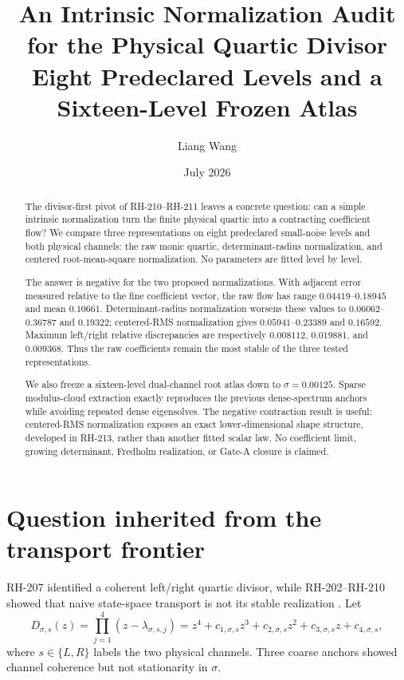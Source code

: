\documentclass[12pt]{article}
\title{An Intrinsic Normalization Audit for the Physical Quartic Divisor\\
\large Eight Predeclared Levels and a Sixteen-Level Frozen Atlas}
\author{Liang Wang}\date{July 2026}
\theoremstyle{remark}\newtheorem{remark}[theorem]{Remark}
\begin{document}
\maketitle
\begin{abstract}
The divisor-first pivot of RH-210--RH-211 leaves a concrete question: can a
simple intrinsic normalization turn the finite physical quartic into a
contracting coefficient flow?  We compare three representations on eight
predeclared small-noise levels and both physical channels: the raw monic
quartic, determinant-radius normalization, and centered root-mean-square
normalization.  No parameters are fitted level by level.

The answer is negative for the two proposed normalizations.  With adjacent
error measured relative to the fine coefficient vector, the raw flow has
range $0.04419$--$0.18945$ and mean $0.10661$.  Determinant-radius
normalization worsens these values to $0.06062$--$0.36787$ and $0.19322$;
centered-RMS normalization gives $0.05941$--$0.23389$ and $0.16592$.
Maximum left/right relative discrepancies are respectively $0.008112$,
$0.019881$, and $0.009368$.  Thus the raw coefficients remain the most
stable of the three tested representations.

We also freeze a sixteen-level dual-channel root atlas down to
$\sigma=0.00125$.  Sparse modulus-cloud extraction exactly reproduces the
previous dense-spectrum anchors while avoiding repeated dense eigensolves.
The negative contraction result is useful: centered-RMS normalization exposes
an exact lower-dimensional shape structure, developed in RH-213, rather than
another fitted scalar law.  No coefficient limit, growing determinant,
Fredholm realization, or Gate-A closure is claimed.
\end{abstract}

\section{Question inherited from the transport frontier}

RH-207 identified a coherent left/right quartic divisor, while RH-202--RH-210
showed that naive state-space transport is not its stable realization
\citep{WangRH207,WangRH210,WangRH211}.  Let
\begin{equation}\label{eq:raw}
 D_{\sigma,s}(z)=\prod_{j=1}^{4}(z-\lambda_{\sigma,s,j})
 =z^4+c_{1,\sigma,s}z^3+c_{2,\sigma,s}z^2
   +c_{3,\sigma,s}z+c_{4,\sigma,s},
\end{equation}
where $s\in\{L,R\}$ labels the two physical channels.  Three coarse anchors
showed channel coherence but not stationarity in $\sigma$.
\end{document}
